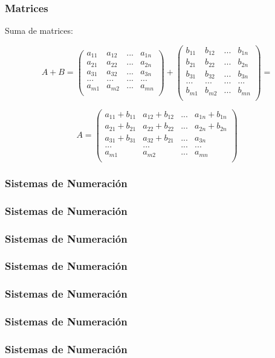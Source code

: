 \documentclass{beamer}
\begin{document}
\begin{frame}
\frametitle{Matrices}

Suma de matrices:

\[
A + B = \begin{pmatrix}
a_{11} & a_{12}  & ...  & a_{1n} \\
a_{21} & a_{22}  & ...  & a_{2n} \\
a_{31} & a_{32}  & ...  & a_{3n} \\
... & ... & ... & ... \\
a_{m1} & a_{m2}  & ...  & a_{mn}  \\
\end{pmatrix} + \begin{pmatrix}
b_{11} & b_{12}  & ...  & b_{1n} \\
b_{21} & b_{22}  & ...  & b_{2n} \\
b_{31} & b_{32}  & ...  & b_{3n} \\
... & ... & ... & ... \\
b_{m1} & b_{m2}  & ...  & b_{mn}  \\
\end{pmatrix} =
\]

\[
A = \begin{pmatrix}  
a_{11}+b_{11} & a_{12}+b_{12}  & ...  & a_{1n}+b_{1n} \\
a_{21}+b_{21} & a_{22}+b_{22}  & ...  & a_{2n}+b_{2n} \\
a_{31}+b_{31} & a_{32}+b_{21}  & ...  & a_{3n} \\
... & ... & ... & ... \\
a_{m1} & a_{m2}  & ...  & a_{mn}  \\
\end{pmatrix}
\]



\end{frame}\begin{frame}
\frametitle{Sistemas de Numeración}


\end{frame}\begin{frame}
\frametitle{Sistemas de Numeración}


\end{frame}\begin{frame}
\frametitle{Sistemas de Numeración}


\end{frame}\begin{frame}
\frametitle{Sistemas de Numeración}


\end{frame}\begin{frame}
\frametitle{Sistemas de Numeración}


\end{frame}\begin{frame}
\frametitle{Sistemas de Numeración}


\end{frame}\begin{frame}
\frametitle{Sistemas de Numeración}


\end{frame}
\end{document}
